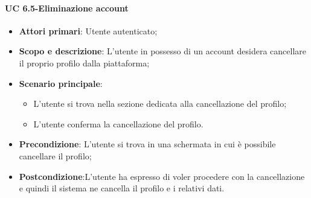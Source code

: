          \paragraph{UC 6.5-Eliminazione account}
            \begin{itemize}
                \item \textbf{Attori primari}: Utente autenticato;
                
                \item \textbf{Scopo e descrizione}: L'utente in possesso di un account desidera cancellare il proprio profilo dalla piattaforma; 
                \item \textbf{Scenario principale}:
                    \begin{itemize}
                        \item L'utente si trova nella sezione dedicata alla cancellazione del profilo;
                        \item L'utente conferma la cancellazione del profilo.
                    \end{itemize}
               
                \item \textbf{Precondizione}: L'utente si trova in una schermata in cui è possibile cancellare il profilo;
                \item \textbf{Postcondizione}:L’utente ha espresso di voler procedere con la cancellazione e quindi
                il sistema ne cancella il profilo e i relativi dati.
            \end{itemize}
            
            
